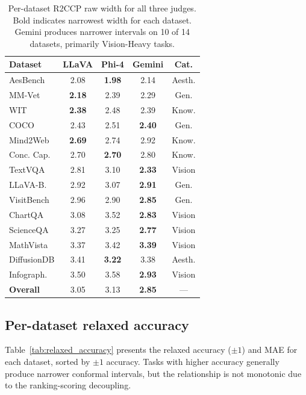 \documentclass{article}
\begin{document}
\begin{table}[t]
\centering
\caption{Per-dataset R2CCP raw width for all three judges. Bold indicates narrowest width for each dataset. Gemini produces narrower intervals on 10 of 14 datasets, primarily Vision-Heavy tasks.}
\label{tab:all_judges_per_dataset}
\small
\begin{tabular}{lcccc}
\toprule
\textbf{Dataset} & \textbf{LLaVA} & \textbf{Phi-4} & \textbf{Gemini} & \textbf{Cat.} \\
\midrule
AesBench & 2.08 & \textbf{1.98} & 2.14 & Aesth. \\
MM-Vet & \textbf{2.18} & 2.39 & 2.29 & Gen. \\
WIT & \textbf{2.38} & 2.48 & 2.39 & Know. \\
COCO & 2.43 & 2.51 & \textbf{2.40} & Gen. \\
Mind2Web & \textbf{2.69} & 2.74 & 2.92 & Know. \\
Conc. Cap. & 2.70 & \textbf{2.70} & 2.80 & Know. \\
TextVQA & 2.81 & 3.10 & \textbf{2.33} & Vision \\
LLaVA-B. & 2.92 & 3.07 & \textbf{2.91} & Gen. \\
VisitBench & 2.96 & 2.90 & \textbf{2.85} & Gen. \\
ChartQA & 3.08 & 3.52 & \textbf{2.83} & Vision \\
ScienceQA & 3.27 & 3.25 & \textbf{2.77} & Vision \\
MathVista & 3.37 & 3.42 & \textbf{3.39} & Vision \\
DiffusionDB & 3.41 & \textbf{3.22} & 3.38 & Aesth. \\
Infograph. & 3.50 & 3.58 & \textbf{2.93} & Vision \\
\midrule
\textbf{Overall} & 3.05 & 3.13 & \textbf{2.85} & --- \\
\bottomrule
\end{tabular}
\end{table}

\subsection{Per-dataset relaxed accuracy}

Table~\ref{tab:relaxed_accuracy} presents the relaxed accuracy ($\pm 1$) and MAE for each dataset, sorted by $\pm 1$ accuracy. Tasks with higher accuracy generally produce narrower conformal intervals, but the relationship is not monotonic due to the ranking-scoring decoupling.
\end{document}

